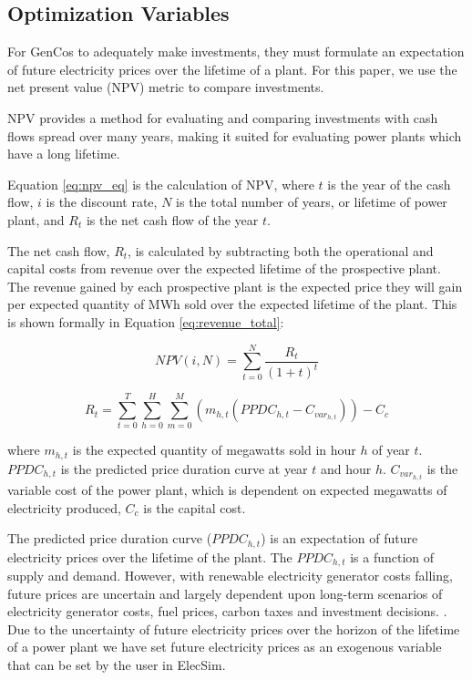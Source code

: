 \subsection{Optimization Variables}


For GenCos to adequately make investments, they must formulate an expectation of future electricity prices over the lifetime of a plant. For this paper, we use the net present value (NPV) metric to compare investments. 


NPV provides a method for evaluating and comparing investments with cash flows spread over many years, making it suited for evaluating power plants which have a long lifetime.  

Equation \ref{eq:npv_eq} is the calculation of NPV, where $t$ is the year of the cash flow, $i$ is the discount rate, $N$ is the total number of years, or lifetime of power plant, and $R_t$ is the net cash flow of the year $t$.

The net cash flow, $R_t$, is calculated by subtracting both the operational and capital costs from revenue over the expected lifetime of the prospective plant. The revenue gained by each prospective plant is the expected price they will gain per expected quantity of MWh sold over the expected lifetime of the plant. This is shown formally in Equation \ref{eq:revenue_total}:

\begin{equation} \label{eq:npv_eq}
NPV(i, N) = \sum_{t=0}^{N}\frac{R_t}{(1+t)^t}
\end{equation}




\begin{equation}
\label{eq:revenue_total}
R_t = 
\sum\limits_{t=0}^T 
\sum\limits_{h=0}^H
\sum\limits_{m=0}^M \left(
m_{h,t}(PPDC_{h,t}
-
C_{var_{h,t}})\right)
- C_c
\end{equation}

\noindent where $m_{h,t}$ is the expected quantity of megawatts sold in hour $h$ of year $t$. $PPDC_{h,t}$ is the predicted price duration curve at year $t$ and hour $h$. $C_{var_{h,t}}$ is the variable cost of the power plant, which is dependent on expected megawatts of electricity produced, $C_c$ is the capital cost.

The predicted price duration curve ($PPDC_{h,t}$) is an expectation of future electricity prices over the lifetime of the plant. The $PPDC_{h,t}$ is a function of supply and demand. However, with renewable electricity generator costs falling, future prices are uncertain and largely dependent upon long-term scenarios of electricity generator costs, fuel prices, carbon taxes and investment decisions. \cite{IRENA2014}. Due to the uncertainty of future electricity prices over the horizon of the lifetime of a power plant we have set future electricity prices as an exogenous variable that can be set by the user in ElecSim. 


